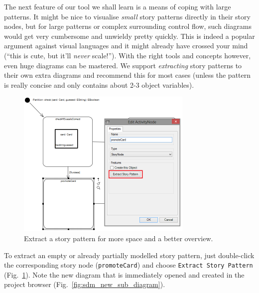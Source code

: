 The next feature of our tool we shall learn is a means of coping with large
patterns.  It might be nice to visualise \emph{small} story patterns directly in
their story nodes, but for large patterns or complex surrounding control flow,
such diagrams would get very cumbersome and unwieldy pretty quickly.  This is
indeed a popular argument against visual languages and it might already have
crossed your mind (``this is cute, but it'll \emph{never} scale!'').  With the
right tools and concepts however, even huge diagrams can be mastered.  We
support \emph{extracting} story patterns to their own extra diagrams and
recommend this for most cases (unless the pattern is really concise and
only contains about 2-3 object variables).

\begin{figure}[htbp]
\begin{center}
  \includegraphics[width=0.75\textwidth]{pics/sdmBilder/check/sdm21}
  \caption{Extract a story pattern for more space and a better overview.}
  \label{fig:sdm_check_extract_storypattern}
\end{center}
\end{figure}

To extract an empty or already
partially modelled story pattern, just double-click the corresponding story node
(\texttt{promoteCard}) and choose \texttt{Extract Story Pattern}
(Fig.~\ref{fig:sdm_check_extract_storypattern}). Note the new diagram that is
immediately opened and created in the project browser
(Fig.~\ref{fig:sdm_new_sub_diagram}).

